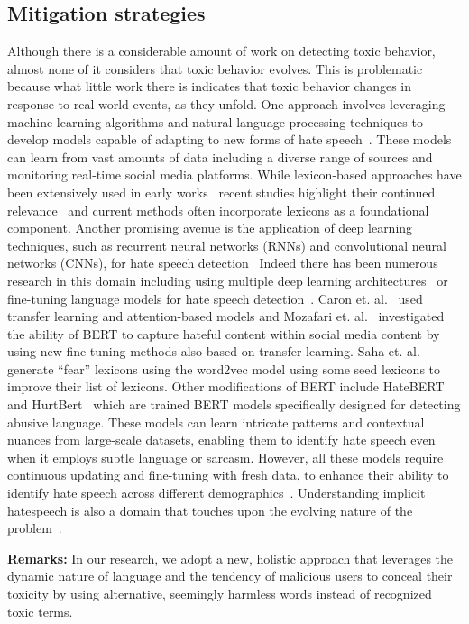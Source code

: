 \subsection{Mitigation strategies}
Although there is a considerable amount of work on detecting toxic behavior, almost none of it considers that toxic behavior evolves.
This is problematic because what little work there is indicates that toxic behavior changes in response to real-world events, as they unfold.
One approach involves leveraging machine learning algorithms and natural language processing techniques to develop models capable of adapting to new forms of hate speech~\cite{gao2018neural}.
These models can learn from vast amounts of data including a diverse range of sources and monitoring real-time social media platforms. While lexicon-based approaches have been extensively used in early works~\cite{burnap2015cyber,founta2018large} recent studies highlight their continued relevance~\cite{basile2019semeval,mozafari2020bert} and current methods often incorporate lexicons as a foundational component. 
Another promising avenue is the application of deep learning techniques, such as recurrent neural networks (RNNs) and convolutional neural networks (CNNs), for hate speech detection~\cite{chatzakou2017hate}
Indeed there has been numerous research in this domain including using multiple deep learning architectures~\cite{badjatiya2017deep} or fine-tuning language models for hate speech detection~\cite{howard2018universal}.
Caron et. al.~\cite{Caron2022} used transfer learning and attention-based models and Mozafari et. al.~\cite{mozafari2020bert} investigated the ability of BERT to capture hateful content within social media content by using new fine-tuning methods also based on transfer learning. Saha et. al.~\cite{saha2021} generate ``fear'' lexicons using the word2vec model using some seed lexicons to improve their list of lexicons. Other modifications of BERT include HateBERT~\cite{caselli-etal-2021-hatebert} and HurtBert~\cite{hurtbert2020} which are trained BERT models specifically designed for detecting abusive language. These models can learn intricate patterns and contextual nuances from large-scale datasets, enabling them to identify hate speech even when it employs subtle language or sarcasm. However, all these models require continuous updating and fine-tuning with fresh data, to enhance their ability to identify hate speech across different demographics~\cite{schmidt2017survey}. Understanding implicit hatespeech is also a domain that touches upon the evolving nature of the problem~\cite{elsherief-etal-2021-latent, hartvigsen-etal-2022-toxigen}.

\noindent \textbf{Remarks: }In our research, we adopt a new, holistic approach that leverages the dynamic nature of language and the tendency of malicious users to conceal their toxicity by using alternative, seemingly harmless words instead of recognized toxic terms.